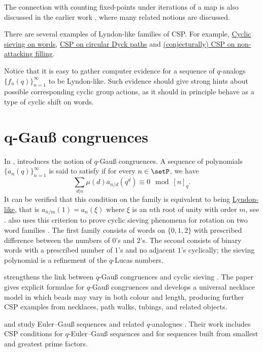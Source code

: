 The connection with counting fixed-points under iterations of a map is also 
discussed in the earlier work \cite{Zarelua2008}, 
where many related notions are discussed.


There are several examples of Lyndon-like families of CSP.
For example, \hyperref[cspWords]{Cyclic sieving on words}, \hyperref[cspAreaSequences]{CSP on circular Dyck paths}
and \hyperref[cspMacdonaldE]{(conjecturally) CSP on non-attacking filling}.


Notice that it is easy to gather computer evidence for 
a sequence of $q$-analogs $\{f_n(q)\}_{n=1}^\infty$ to be Lyndon-like.
Such evidence should give strong hints about 
possible corresponding cyclic group actions, 
as it should in principle behave as a type of cyclic shift on words.

\section[lyndonCSPII]{q-Gauß congruences}

In \cite{Gorodetsky2019},  introduces the notion of $q$-Gauß congruences.
A sequence of polynomials $\{ a_n(q) \}_{n=1}^\infty$ is said to 
satisfy  if for every $n \in \setP$, we have 
\[
   \sum_{d|n} \mu(d) a_{n/d}(q^d) \equiv 0 \mod [n]_q.
\]
It can be verified that this condition on the family is equivalent to being \hyperref[lyndonCSP]{Lyndon-like},
that is $a_{n/m}(1) = a_n(\xi)$ where $\xi$ is an $n$th root of unity with order $m$,
see \cite[Cor. 2.5]{Gorodetsky2019}.
 also uses this criterion to prove cyclic sieving
phenomena for rotation on two word families \cite[Thm.~1.2]{Gorodetsky2019}.
The first family consists of words on $\{0,1,2\}$ with prescribed difference
between the numbers of $0$'s and $2$'s.  The second consists of binary words
with a prescribed number of $1$'s and no adjacent $1$'s cyclically; the
sieving polynomial is a refinement of the $q$-Lucas numbers.

 strengthens the link between $q$-Gauß congruences and
cyclic sieving \cite{Gossow2024GaussCongruence}.  The paper gives explicit
formulae for $q$-Gauß congruences and develops a universal necklace model in
which beads may vary in both colour and length, producing further CSP examples
from necklaces, path walks, tubings, and related objects.

 and  study Euler--Gauß
sequences and related $q$-analogues \cite{NarayanKiran2025GaussSequences}.
Their work includes CSP conditions for $q$-Euler--Gauß sequences and for
sequences built from smallest and greatest prime factors.





